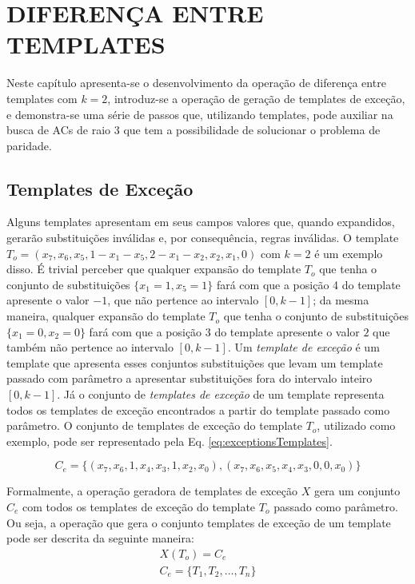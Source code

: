 \section{DIFERENÇA ENTRE TEMPLATES}
\label{sec:resultadosParciais}
Neste capítulo apresenta-se o desenvolvimento da operação de diferença entre templates com $k=2$, introduz-se a operação de geração de templates de exceção, e demonstra-se uma série de passos que, utilizando templates, pode auxiliar na busca de ACs de raio 3 que tem a possibilidade de solucionar o problema de paridade.

\subsection{Templates de Exceção}
Alguns templates apresentam em seus campos valores que, quando expandidos, gerarão substituições inválidas e, por consequência, regras inválidas. O template $T_o = (x_7, x_6, x_5, 1 - x_1 - x_5, 2 - x_1 - x_2, x_2, x_1, 0)$ com $k=2$ é um exemplo disso. É trivial perceber que qualquer expansão do template $T_o$ que tenha o conjunto de substituições $\{x_1 = 1, x_5 = 1\}$ fará com que a posição 4 do template apresente o valor $-1$, que não pertence ao intervalo $[0,k-1]$; da mesma maneira, qualquer expansão do template $T_o$ que tenha o conjunto de substituições $\{x_1 = 0, x_2 = 0\}$ fará com que a posição 3 do template apresente o valor $2$ que também não pertence ao intervalo $[0,k-1]$. Um \textit{template de exceção} é um template que apresenta esses conjuntos substituições que levam um template passado com parâmetro a apresentar substituições fora do intervalo inteiro $[0, k-1]$. Já o conjunto de \textit{templates de exceção} de um template representa todos os templates de exceção encontrados a partir do template passado como parâmetro. O conjunto de templates de exceção do template $T_o$, utilizado como exemplo, pode ser representado pela Eq. \ref{eq:exceptionsTemplates}.

\begin{equation}
C_e = \{(x_7, x_6, 1, x_4, x_3, 1, x_2, x_0),(x_7, x_6, x_5, x_4, x_3, 0, 0, x_0)\}
\label{eq:exceptionsTemplates}
\end{equation}

Formalmente, a operação geradora de templates de exceção $X$ gera um conjunto $C_e$ com todos os templates de exceção do template $T_o$ passado como parâmetro. Ou seja, a operação que gera o conjunto templates de exceção de um template pode ser descrita da seguinte maneira:
\begin{equation}
\begin{split}
X(T_o)= C_e \\
C_e = \{T_1,T_2,\dots, T_n\}\\
\end{split}
\end{equation}

